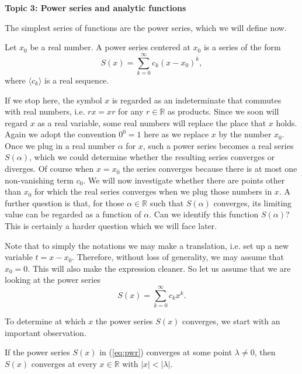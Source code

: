 \documentclass[11pt]{article}
\begin{document}
\begin{center}
  \textbf{Topic 3: Power series and analytic functions}
\end{center}

The simplest series of functions are the power series, which we will define now.

\begin{defn}
  Let $x_0$ be a real number.
  A \textsf{power series} centered at $x_0$ is a series of the form
  \[
    S(x) = \sum_{k=0}^\infty c_k (x - x_0)^k,
  \]
  where $\langle c_k \rangle$ is a real sequence.
\end{defn}

If we stop here, the symbol $x$ is regarded as an indeterminate that commutes with real numbers, i.e. $rx = xr$ for any $r \in \mathbb{R}$ as products.
Since we soon will regard $x$ as a real variable, some real numbers will replace the place that $x$ holds.
Again we adopt the convention $0^0 = 1$ here as we replace $x$ by the number $x_0$.
Once we plug in a real number $\alpha$ for $x$, such a power series becomes a real series $S(\alpha)$, which we could determine whether the resulting series converges or diverges.
Of course when $x = x_0$ the series converges because there is at most one non-vanishing term $c_0$.
We will now investigate whether there are points other than $x_0$ for which the real series converges when we plug those numbers in $x$.
A further question is that, for those $\alpha \in \mathbb{R}$ such that $S(\alpha)$ converges, its limiting value can be regarded as a function of $\alpha$.  Can we identify this function $S(\alpha)$?
This is certainly a harder question which we will face later.

Note that to simply the notations we may make a translation, i.e. set up a new variable $t = x - x_0$.
Therefore, without loss of generality, we may assume that $x_0 = 0$.
This will also make the expression cleaner.
So let us assume that we are looking at the power series
\begin{equation}
  \label{eq:pwr}
  S(x) = \sum_{k=0}^\infty c_k x^k.
\end{equation}

To determine at which $x$ the power series $S(x)$ converges, we start with an important observation.

\begin{thm}
  \label{thm:small-x}
  If the power series $S(x)$ in (\ref{eq:pwr}) converges at some point $\lambda \ne 0$, then $S(x)$ converges at every $x \in \mathbb{R}$ with $|x| < |\lambda|$.
\end{thm}
\end{document}

